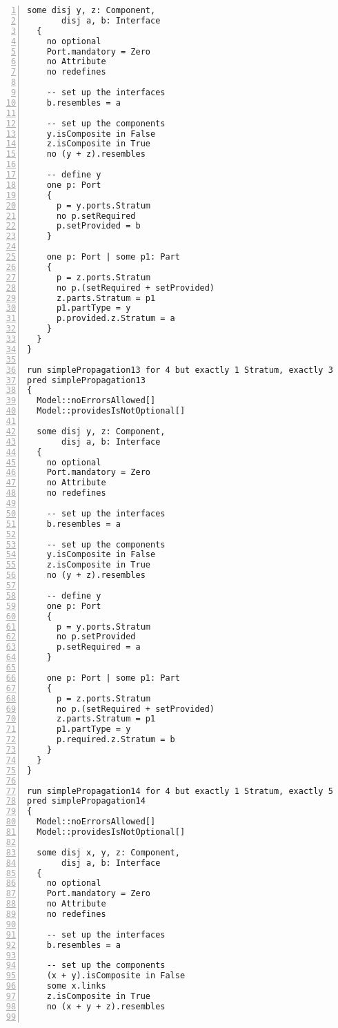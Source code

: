 \begin{lstlisting}[caption={unittests\_inference.als}, numbers=left]
  some disj y, z: Component,
       disj a, b: Interface
  {
    no optional
    Port.mandatory = Zero
    no Attribute
    no redefines
  
    -- set up the interfaces
    b.resembles = a
  
    -- set up the components
    y.isComposite in False
    z.isComposite in True
    no (y + z).resembles
    
    -- define y
    one p: Port
    {
      p = y.ports.Stratum
      no p.setRequired
      p.setProvided = b
    }
    
    one p: Port | some p1: Part
    {
      p = z.ports.Stratum
      no p.(setRequired + setProvided)
      z.parts.Stratum = p1
      p1.partType = y
      p.provided.z.Stratum = a
    }
  }
}

run simplePropagation13 for 4 but exactly 1 Stratum, exactly 3 Element, exactly 2 Port, exactly 1 Part, exactly 2 Component, exactly 2 Interface
pred simplePropagation13
{
  Model::noErrorsAllowed[]
  Model::providesIsNotOptional[]

  some disj y, z: Component,
       disj a, b: Interface
  {
    no optional
    Port.mandatory = Zero
    no Attribute
    no redefines
  
    -- set up the interfaces
    b.resembles = a
  
    -- set up the components
    y.isComposite in False
    z.isComposite in True
    no (y + z).resembles
    
    -- define y
    one p: Port
    {
      p = y.ports.Stratum
      no p.setProvided
      p.setRequired = a
    }
    
    one p: Port | some p1: Part
    {
      p = z.ports.Stratum
      no p.(setRequired + setProvided)
      z.parts.Stratum = p1
      p1.partType = y
      p.required.z.Stratum = b
    }
  }
}

run simplePropagation14 for 4 but exactly 1 Stratum, exactly 5 Element, exactly 4 Port, exactly 2 Part, exactly 3 Component, exactly 2 Interface, exactly 2 Connector, 7 LinkEnd
pred simplePropagation14
{
  Model::noErrorsAllowed[]
  Model::providesIsNotOptional[]

  some disj x, y, z: Component,
       disj a, b: Interface
  {
    no optional
    Port.mandatory = Zero
    no Attribute
    no redefines
  
    -- set up the interfaces
    b.resembles = a
  
    -- set up the components
    (x + y).isComposite in False
    some x.links
    z.isComposite in True
    no (x + y + z).resembles
    

\end{lstlisting}
